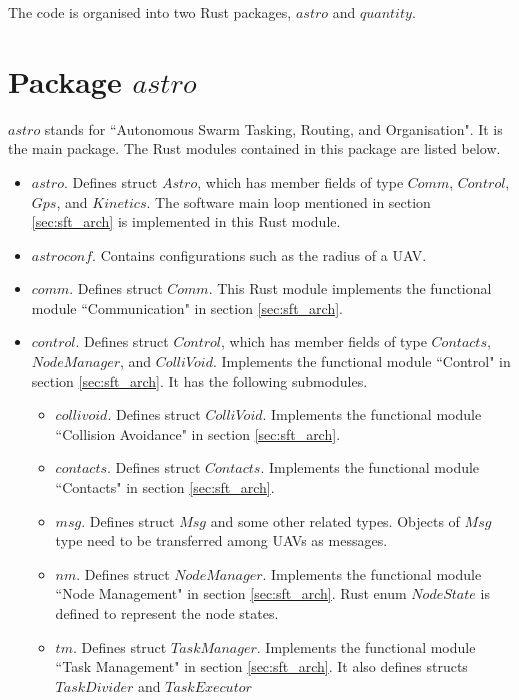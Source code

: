 The code is organised into two Rust packages, $astro$ and $quantity$.

\section{Package \texorpdfstring{$astro$}{astro}}

$astro$ stands for ``Autonomous Swarm Tasking, Routing, and Organisation".
It is the main package. The Rust modules contained in this package are listed below.
\begin{itemize}
  \item $astro$. Defines struct $Astro$,
        which has member fields of type $Comm$, $Control$, $Gps$, and $Kinetics$.
        The software main loop mentioned in section \ref{sec:sft_arch} is implemented
        in this Rust module.
  \item $astroconf$. Contains configurations such as the radius of a UAV.
  \item $comm$. Defines struct $Comm$.
        This Rust module implements
        the functional module ``Communication" in section \ref{sec:sft_arch}.
  \item $control$. Defines struct $Control$,
        which has member fields of type $Contacts$, $NodeManager$, and $ColliVoid$.
        Implements the functional module ``Control" in section \ref{sec:sft_arch}.
        It has the following submodules.
    \begin{itemize}
      \item $collivoid$. Defines struct $ColliVoid$.
            Implements the functional module ``Collision Avoidance"
            in section \ref{sec:sft_arch}.
      \item $contacts$. Defines struct $Contacts$.
            Implements the functional module ``Contacts" in section \ref{sec:sft_arch}.
      \item $msg$. Defines struct $Msg$ and some other related types.
            Objects of $Msg$ type need to be transferred among UAVs as messages.
      \item $nm$. Defines struct $NodeManager$.
            Implements the functional module ``Node Management" in section \ref{sec:sft_arch}.
            Rust enum $NodeState$ is defined to represent the node states.
      \item $tm$. Defines struct $TaskManager$.
            Implements the functional module ``Task Management" in section \ref{sec:sft_arch}.
            It also defines structs $TaskDivider$ and $TaskExecutor$

\end{itemize}
\end{itemize}
